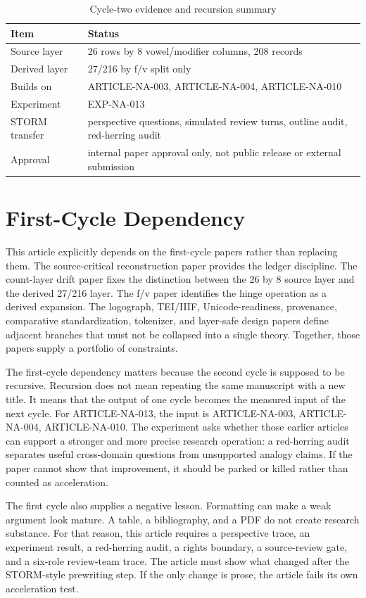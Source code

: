 \documentclass[sigconf,nonacm]{acmart}
\begin{document}
\begin{table}[t]
\caption{Cycle-two evidence and recursion summary}
\label{tab:cycle2}
\begin{tabular}{p{}p{}}
\toprule
Item & Status \\
\midrule
Source layer & 26 rows by 8 vowel/modifier columns, 208 records \\
Derived layer & 27/216 by f/v split only \\
Builds on & ARTICLE-NA-003, ARTICLE-NA-004, ARTICLE-NA-010 \\
Experiment & EXP-NA-013 \\
STORM transfer & perspective questions, simulated review turns, outline audit, red-herring audit \\
Approval & internal paper approval only, not public release or external submission \\
\bottomrule
\end{tabular}
\end{table}


\section{First-Cycle Dependency}
This article explicitly depends on the first-cycle papers rather than replacing
them. The source-critical reconstruction paper provides the ledger discipline.
The count-layer drift paper fixes the distinction between the 26 by 8 source
layer and the derived 27/216 layer. The f/v paper identifies the hinge operation
as a derived expansion. The logograph, TEI/IIIF, Unicode-readiness, provenance,
comparative standardization, tokenizer, and layer-safe design papers define
adjacent branches that must not be collapsed into a single theory. Together,
those papers supply a portfolio of constraints.

The first-cycle dependency matters because the second cycle is supposed to be
recursive. Recursion does not mean repeating the same manuscript with a new
title. It means that the output of one cycle becomes the measured input of the
next cycle. For ARTICLE-NA-013, the input is ARTICLE-NA-003, ARTICLE-NA-004, ARTICLE-NA-010. The experiment asks
whether those earlier articles can support a stronger and more precise research
operation: a red-herring audit separates useful cross-domain questions from unsupported analogy claims. If the paper cannot show that improvement, it should be
parked or killed rather than counted as acceleration.

The first cycle also supplies a negative lesson. Formatting can make a weak
argument look mature. A table, a bibliography, and a PDF do not create research
substance. For that reason, this article requires a perspective trace, an
experiment result, a red-herring audit, a rights boundary, a source-review gate,
and a six-role review-team trace. The article must show what changed after the
STORM-style prewriting step. If the only change is prose, the article fails its
own acceleration test.
\end{document}
